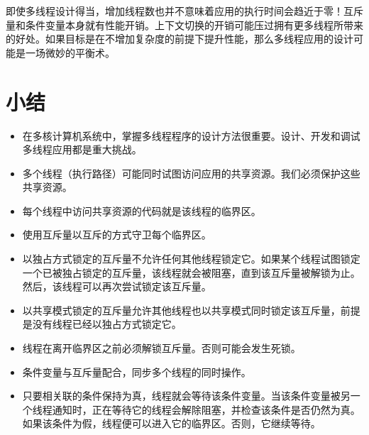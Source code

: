 即使多线程设计得当，增加线程数也并不意味着应用的执行时间会趋近于零！互斥量和条件变量本身就有性能开销。上下文切换的开销可能压过拥有更多线程所带来的好处。如果目标是在不增加复杂度的前提下提升性能，那么多线程应用的设计可能是一场微妙的平衡术。

\section*{小结}

\begin{itemize}
\item 在多核计算机系统中，掌握多线程程序的设计方法很重要。设计、开发和调试多线程应用都是重大挑战。
\item 多个线程（执行路径）可能同时试图访问应用的共享资源。我们必须保护这些共享资源。
\item 每个线程中访问共享资源的代码就是该线程的临界区。
\item 使用互斥量以互斥的方式守卫每个临界区。
\item 以独占方式锁定的互斥量不允许任何其他线程锁定它。如果某个线程试图锁定一个已被独占锁定的互斥量，该线程就会被阻塞，直到该互斥量被解锁为止。然后，该线程可以再次尝试锁定该互斥量。
\item 以共享模式锁定的互斥量允许其他线程也以共享模式同时锁定该互斥量，前提是没有线程已经以独占方式锁定它。
\item 线程在离开临界区之前必须解锁互斥量。否则可能会发生死锁。
\item 条件变量与互斥量配合，同步多个线程的同时操作。
\item 只要相关联的条件保持为真，线程就会等待该条件变量。当该条件变量被另一个线程通知时，正在等待它的线程会解除阻塞，并检查该条件是否仍然为真。如果该条件为假，线程便可以进入它的临界区。否则，它继续等待。
\end{itemize}
